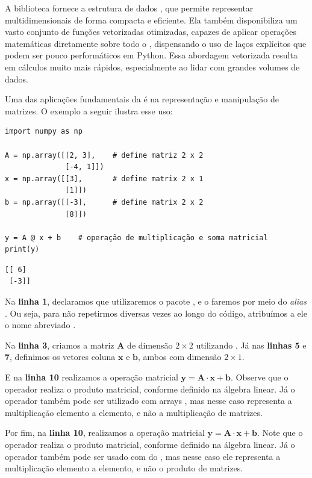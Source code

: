 A biblioteca  fornece a estrutura de dados , que permite representar
 multidimensionais de forma compacta e eficiente.
Ela também disponibiliza um vasto conjunto de funções vetorizadas otimizadas, capazes de aplicar operações matemáticas
diretamente sobre todo o , dispensando o uso de laços explícitos que podem ser pouco performáticos em Python.
Essa abordagem vetorizada resulta em cálculos muito mais rápidos, especialmente ao lidar com grandes volumes de dados.

Uma das aplicações fundamentais da  é na representação e manipulação de matrizes.
O exemplo a seguir ilustra esse uso:
\begin{verbatim}
import numpy as np

A = np.array([[2, 3],    # define matriz 2 x 2
              [-4, 1]])
x = np.array([[3],       # define matrix 2 x 1
              [1]])
b = np.array([[-3],      # define matrix 2 x 2
              [8]])

y = A @ x + b    # operação de multiplicação e soma matricial
print(y)
\end{verbatim}
\begin{verbatim}
[[ 6]
 [-3]]
\end{verbatim}

Na \textbf{linha 1}, declaramos que utilizaremos o pacote , e o faremos por meio do \emph{alias}
.
Ou seja, para não repetirmos  diversas vezes ao longo do código, atribuímos a ele o nome
abreviado .

Na \textbf{linha 3}, criamos a matriz $\mathbf{A}$ de dimensão $2 \times 2$ utilizando .
Já nas \textbf{linhas 5} e \textbf{7}, definimos os vetores coluna $\mathbf{x}$ e $\mathbf{b}$,
ambos com dimensão $2 \times 1$.


E na \textbf{linha 10} realizamos a operação matricial $\mathbf{y} = \mathbf{A} \cdot \mathbf{x} + \mathbf{b}$.
Observe que o operador  realiza o produto matricial, conforme definido na álgebra linear.
Já o operador \inlcode{*} também pode ser utilizado com arrays , mas nesse caso representa
a multiplicação elemento a elemento, e não a multiplicação de matrizes.

Por fim, na \textbf{linha 10}, realizamos a operação matricial $\mathbf{y} = \mathbf{A} \cdot \mathbf{x} + \mathbf{b}$.
Note que o operador  realiza o produto matricial, conforme definido na álgebra linear.
Já o operador \inlcode{*} também pode ser usado com  do ,
mas nesse caso ele representa a multiplicação elemento a elemento, e não o produto de matrizes.

